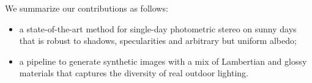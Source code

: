 


We summarize our contributions as follows:
\begin{itemize}
	\item a state-of-the-art method for single-day photometric stereo on sunny days that is robust to shadows, specularities and arbitrary but uniform albedo;
    \item a pipeline to generate synthetic images with a mix of Lambertian and glossy materials that captures the diversity of real outdoor lighting.
\end{itemize}

